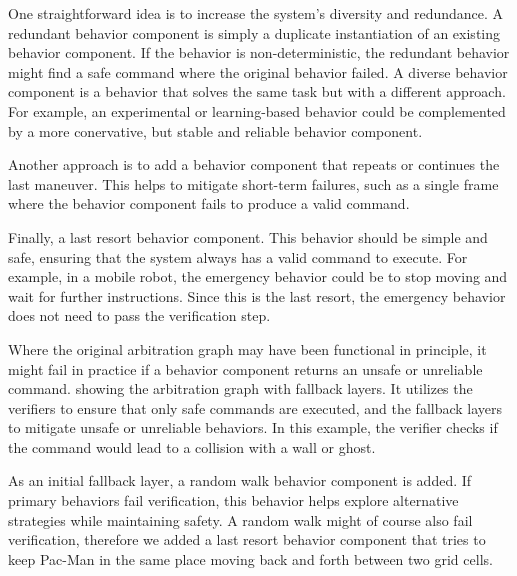 One straightforward idea is to increase the system's diversity and redundance.
A redundant behavior component is simply a duplicate instantiation of an existing behavior component.
If the behavior is non-deterministic, the redundant behavior might find a safe command where the original behavior failed.
A diverse behavior component is a behavior that solves the same task but with a different approach.
For example, an experimental or learning-based behavior could be complemented by a more conervative, but stable and reliable behavior component.
 
Another approach is to add a behavior component that repeats or continues the last maneuver.
This helps to mitigate short-term failures, such as a single frame where the behavior component fails to produce a valid command.

Finally, a last resort behavior component.
This behavior should be simple and safe, ensuring that the system always has a valid command to execute.
For example, in a mobile robot, the emergency behavior could be to stop moving and wait for further instructions.
Since this is the last resort, the emergency behavior does not need to pass the verification step.

Where the original arbitration graph may have been functional in principle, it might fail in practice if a behavior component returns an unsafe or unreliable command.
 showing the arbitration graph with fallback layers.
It utilizes the verifiers to ensure that only safe commands are executed, and the fallback layers to mitigate unsafe or unreliable behaviors.
In this example, the verifier checks if the command would lead to a collision with a wall or ghost.

As an initial fallback layer, a random walk behavior component is added.
If primary behaviors fail verification, this behavior helps explore alternative strategies while maintaining safety.
A random walk might of course also fail verification, therefore we added a last resort behavior component that tries to keep Pac-Man in the same place moving back and forth between two grid cells.

